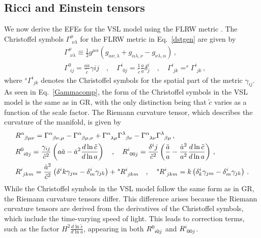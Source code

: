 \documentclass[jkps,preprint,fleqn]{revtex4} %
\newcommand{\tc}{\tilde{c}}
\begin{document}
\subsection{Ricci and Einstein tensors}\label{subsec:RS}
We now derive the EFEs for the VSL model using the FLRW metric \cite{Lee:2020zts,Lee:2025rpw}. The Christoffel symbols $\Gamma^{\mu}_{\,\,\nu\lambda}$ for the FLRW metric in Eq.~\eqref{dstgen} are given by 
\begin{align} 
&\Gamma^{\mu}_{\,\,\nu\lambda} \equiv \frac{1}{2} g^{\mu\alpha} \left( g_{\alpha\nu,\lambda} + g_{\alpha\lambda,\nu} - g_{\nu\lambda,\alpha} \right) \label{Gamma}\,, \\ &\Gamma^{0}_{\,\,ij} = \frac{a\dot{a}}{\tc} \gamma{ij} \quad , \quad \Gamma^{i}_{\,\,0j} = \frac{1}{\tc}  \frac{\dot{a}}{a} \delta^i_j \quad , \quad \Gamma^{i}_{\,\,jk} = ^{s}\Gamma^{i}_{\,\,jk}  \label{Gammacomp} \,, \end{align} 
where $^{s}\Gamma^{i}_{\,\,jk}$ denotes the Christoffel symbols for the spatial part of the metric $\gamma_{ij}$. As seen in Eq.~\eqref{Gammacomp}, the form of the Christoffel symbols in the VSL model is the same as in GR, with the only distinction being that $\tc$ varies as a function of the scale factor.
The Riemann curvature tensor, which describes the curvature of the manifold, is given by 
\begin{align} 
&\tensor{R}{^\alpha_\beta_\mu_\nu} = \tensor{\Gamma}{^\alpha_\beta_\nu_,_\mu} - \tensor{\Gamma}{^\alpha_\beta_\mu_,_\nu} + \tensor{\Gamma}{^\alpha_\lambda_\mu} \tensor{\Gamma}{^\lambda_\beta_\nu} - \tensor{\Gamma}{^\alpha_\lambda_\nu} \tensor{\Gamma}{^\lambda_\beta_\mu} \label{Rabmu} \,, \\ &\tensor{R}{^0_i_0_j} = \frac{\gamma_{ij}}{\tc^2} \left( a \ddot{a} - \dot{a}^2 \frac{d \ln \tc}{d \ln a} \right) \quad , \quad \tensor{R}{^i_0_0_j} = \frac{\delta^{i}{j}}{\tc^2} \left( \frac{\ddot{a}}{a} - \frac{\dot{a}^2}{a^2} \frac{d \ln \tc}{ d \ln a}  \right) \,, \label{R0i0j} \\ &\tensor{R}{^i_j_k_m} = \frac{\dot{a}^2}{\tc^2} \left( \delta^{i}{k} \gamma_{jm} - \delta^i_m \gamma_{jk} \right) + \tensor[^s]{R}{^i_j_k_m} \quad , \quad \tensor[^s]{R}{^i_j_k_m} = k \left( \delta^i_k \gamma_{jm} - \delta^i_m \gamma_{jk} \right) \,. \label{Rijkm} \end{align} 
While the Christoffel symbols in the VSL model follow the same form as in GR, the Riemann curvature tensors differ. This difference arises because the Riemann curvature tensors are derived from the derivatives of the Christoffel symbols, which include the time-varying speed of light. This leads to correction terms, such as the factor $H^2 \frac{d \ln \tc}{d \ln a}$, appearing in both $\tensor{R}{^0_i_0_j}$ and $\tensor{R}{^i_0_0_j}$.
\end{document}
